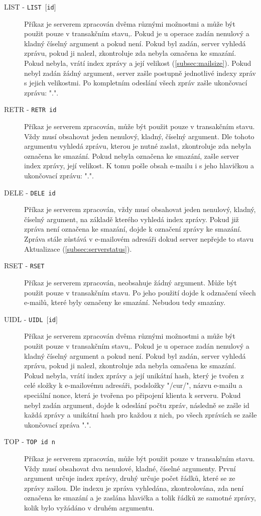 \documentclass[11pt,a4paper]{report}
\begin{document}
\begin{description}
        \item[LIST - \texttt{LIST $[$id$]$}] Příkaz je serverem zpracován dvěma různými možnostmi a může být použit pouze v transakčním stavu,. Pokud je u operace zadán nenulový a kladný číselný argument a pokud není. Pokud byl zadán, server vyhledá zprávu, pokud ji nalezl, zkontroluje zda nebyla označena ke smazání. Pokud nebyla, vrátí index \cite{index} zprávy a její velikost (\ref{subsec:mailsize}). Pokud nebyl zadán žádný argument, server zašle postupně jednotlivé indexy zpráv s jejich velikostmi. Po kompletním odeslání všech zpráv zašle ukončovací zprávu: ".".
        \item[RETR - \texttt{RETR id}] Příkaz je serverem zpracován, může být použit pouze v transakčním stavu. Vždy musí obsahovat jeden nenulový, kladný, číselný argument. Dle tohoto argumentu vyhledá zprávu, kterou je nutné zaslat, zkontroluje zda nebyla označena ke smazání. Pokud nebyla označena ke smazání, zašle server index zprávy, její velikost. K tomu pošle obsah e-mailu i s jeho hlavičkou a ukončovací zprávu: ".".
        \item[DELE - \texttt{DELE id}] Příkaz je serverem zpracován, vždy musí obsahovat jeden nenulový, kladný, číselný argument, na základě kterého vyhledá index zprávy. Pokud již zpráva není označena ke smazání, dojde k označení zprávy ke smazání. Zpráva stále zůstává v e-mailovém adresáři dokud server nepřejde to stavu Aktualizace (\ref{subsec:serverstatus}).
        \item[RSET - \texttt{RSET}] Příkaz je serverem zpracován, neobsahuje žádný argument. Může být použit pouze v transakčním stavu. Po jeho použití dojde k odznačení všech e-mailů, které byly označeny ke smazání. Nebudou tedy smazány.
        \item[UIDL - \texttt{UIDL $[$id$]$}] Příkaz je serverem zpracován dvěma různými možnostmi a může být použit pouze v transakčním stavu,. Pokud je u operace zadán nenulový a kladný číselný argument a pokud není. Pokud byl zadán, server vyhledá zprávu, pokud ji nalezl, zkontroluje zda nebyla označena ke smazání. Pokud nebyla, vrátí index \cite{index} zprávy a její unikátní hash, který je tvořen z celé složky k e-mailovému adresáři, podsložky "/cur/", názvu e-mailu a speciální nonce, která je tvořena po připojení klienta k serveru. Pokud nebyl zadán argument, dojde k odeslání počtu zpráv, následně se zašle id každá zprávy a unikátní hash pro každou z nich, po všech zprávách se zašle ukončovací zpráva ".".
        \item[TOP - \texttt{TOP id n}] Příkaz je serverem zpracován, může být použit pouze v transakčním stavu. Vždy musí obsahovat dva nenulové, kladné, číselné argumenty. První argument určuje index zprávy, druhý určuje počet řádků, které se ze zprávy zašlou. Dle indexu je zpráva vyhledána, zkontrolována, zda není označena ke smazání a je zaslána hlavička a tolik řádků ze samotné zprávy, kolik bylo vyžádáno v druhém argumentu.
    \end{description}
\end{document}
